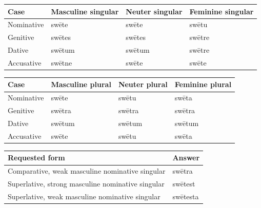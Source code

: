 \par\begingroup
\fontsize{10.5}{13.2}\selectfont
\setlength{\LTleft}{0pt}\setlength{\LTright}{\fill}
\noindent
\begin{tabular}{@{}>{\raggedright\arraybackslash}p{22.0mm}>{\raggedright\arraybackslash}p{31.188mm}>{\raggedright\arraybackslash}p{31.188mm}>{\raggedright\arraybackslash}p{31.188mm}@{}}
\toprule
\textbf{Case} & \textbf{Masculine singular} & \textbf{Neuter singular} & \textbf{Feminine singular} \\
\midrule
Nominative & swēte & swēte & swētu \\
Genitive & swētes & swētes & swētre \\
Dative & swētum & swētum & swētre \\
Accusative & swētne & swēte & swēte \\
\bottomrule
\end{tabular}
\par\endgroup
\par\addvspace{5pt}
\par\begingroup
\fontsize{10.5}{13.2}\selectfont
\setlength{\LTleft}{0pt}\setlength{\LTright}{\fill}
\noindent
\begin{tabular}{@{}>{\raggedright\arraybackslash}p{22.0mm}>{\raggedright\arraybackslash}p{31.188mm}>{\raggedright\arraybackslash}p{31.188mm}>{\raggedright\arraybackslash}p{31.188mm}@{}}
\toprule
\textbf{Case} & \textbf{Masculine plural} & \textbf{Neuter plural} & \textbf{Feminine plural} \\
\midrule
Nominative & swēte & swētu & swēta \\
Genitive & swētra & swētra & swētra \\
Dative & swētum & swētum & swētum \\
Accusative & swēte & swētu & swēta \\
\bottomrule
\end{tabular}
\par\endgroup

\par\begingroup
\fontsize{10.5}{13.2}\selectfont
\setlength{\LTleft}{0pt}\setlength{\LTright}{\fill}
\noindent
\begin{tabular}{@{}>{\raggedright\arraybackslash}p{89.83mm}>{\raggedright\arraybackslash}p{31.36mm}@{}}
\toprule
\textbf{Requested form} & \textbf{Answer} \\
\midrule
Comparative, weak masculine nominative singular & swētra \\
Superlative, strong masculine nominative singular & swētest \\
Superlative, weak masculine nominative singular & swētesta \\
\bottomrule
\end{tabular}
\par\endgroup

